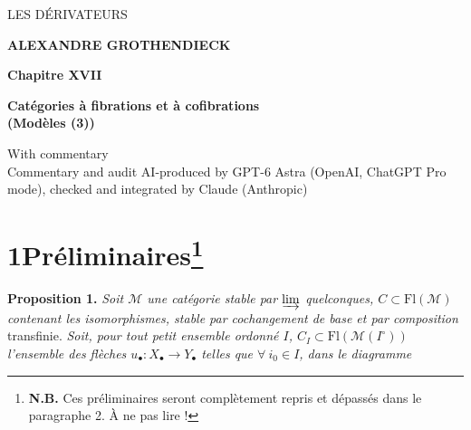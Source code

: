 \documentclass[11pt]{article}
\newcommand{\printedpage}[1]{\marginpar{\footnotesize p.~#1\ifstrequal{#1}{1}{\\[2pt]{[page 1]}}{}}}
\newcommand{\msp}[1]{\ifstrequal{#1}{page 1}{}{\marginpar{\footnotesize [#1]}}}
\newcommand{\Fl}{\mathrm{Fl}}
\begin{document}
\printedpage{--}

\begin{center}
\vspace*{5cm}

{\Large\textsf{LES DÉRIVATEURS}}

\bigskip

\textbf{ALEXANDRE GROTHENDIECK}

\vspace{2cm}

\textbf{Chapitre XVII}

\medskip

\textbf{Catégories à fibrations et à cofibrations}\\
\textbf{(Modèles (3))}

\bigskip
{\small\textsf{With commentary}}\\[0.6ex]
{\footnotesize Commentary and audit AI-produced by GPT-6 Astra (OpenAI, ChatGPT Pro mode), checked and integrated by Claude (Anthropic)}

\end{center}

\clearpage

\printedpage{--}

\vspace*{5cm}


\clearpage

\printedpage{1}

\msp{page 1}

\section*{1\quad Préliminaires\footnote{\textbf{N.B.} Ces préliminaires seront complètement repris et dépassés dans le paragraphe 2. À ne pas lire !}}

\textbf{Proposition 1.} \textit{Soit $\mathcal{M}$ une catégorie stable par $\varinjlim$ quelconques, $C \subset \Fl(\mathcal{M})$ contenant les isomorphismes, stable par cochangement de base et par composition} transfinie. \textit{Soit, pour tout petit ensemble ordonné $I$, $C_I \subset \Fl(\mathcal{M}(I^{\circ}))$ l'ensemble des flèches $u_\bullet : X_\bullet \longrightarrow Y_\bullet$ telles que $\forall\ i_0 \in I$, dans le diagramme} %
\end{document}
